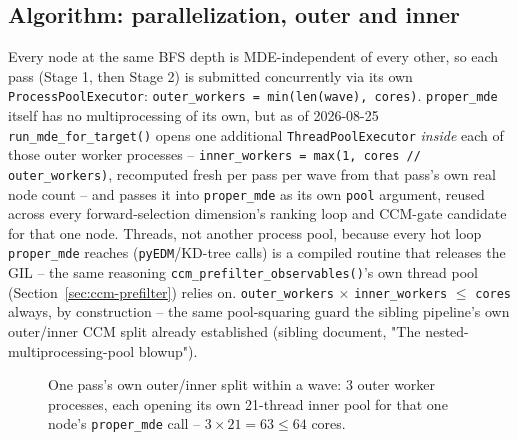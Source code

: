 \documentclass[11pt]{article}
\begin{document}
\subsection{Algorithm: parallelization, outer and inner}
\label{sec:stage1-parallelization}
Every node at the same BFS depth is MDE-independent of every other, so each pass (Stage 1, then Stage 2) is submitted concurrently via its own \texttt{ProcessPoolExecutor}: \texttt{outer\_workers = min(len(wave), cores)}. \texttt{proper\_mde} itself has no multiprocessing of its own, but as of 2026-08-25 \texttt{run\_mde\_for\_target()} opens one additional \texttt{ThreadPoolExecutor} \emph{inside} each of those outer worker processes -- \texttt{inner\_workers = max(1, cores // outer\_workers)}, recomputed fresh per pass per wave from that pass's own real node count -- and passes it into \texttt{proper\_mde} as its own \texttt{pool} argument, reused across every forward-selection dimension's ranking loop and CCM-gate candidate for that one node. Threads, not another process pool, because every hot loop \texttt{proper\_mde} reaches (\texttt{pyEDM}/KD-tree calls) is a compiled routine that releases the GIL -- the same reasoning \texttt{ccm\_prefilter\_observables()}'s own thread pool (Section~\ref{sec:ccm-prefilter}) relies on. \texttt{outer\_workers} $\times$ \texttt{inner\_workers} $\leq$ \texttt{cores} always, by construction -- the same pool-squaring guard the sibling pipeline's own outer/inner CCM split already established (sibling document, "The nested-multiprocessing-pool blowup").

\begin{figure}[H]
\centering
{}
\caption{One pass's own outer/inner split within a wave: 3 outer worker processes, each opening its own 21-thread inner pool for that one node's \texttt{proper\_mde} call -- $3 \times 21 = 63 \leq 64$ cores.}
\label{fig:stage1-inner-pool}
\end{figure}
\end{document}

